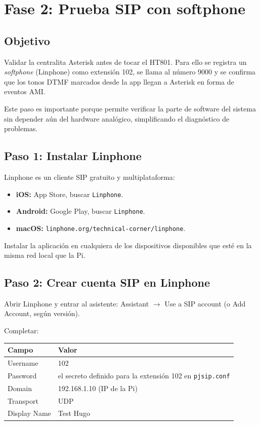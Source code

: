 \chapter{Fase 2: Prueba SIP con softphone}

\section{Objetivo}

Validar la centralita Asterisk antes de tocar el HT801. Para ello se registra un \emph{softphone} (Linphone) como extensión 102, se llama al número 9000 y se confirma que los tonos DTMF marcados desde la app llegan a Asterisk en forma de eventos AMI.

Este paso es importante porque permite verificar la parte de software del sistema sin depender aún del hardware analógico, simplificando el diagnóstico de problemas.

\section{Paso 1: Instalar Linphone}

Linphone es un cliente SIP gratuito y multiplataforma:

\begin{itemize}
  \item \textbf{iOS:} App Store, buscar \texttt{Linphone}.
  \item \textbf{Android:} Google Play, buscar \texttt{Linphone}.
  \item \textbf{macOS:} \texttt{linphone.org/technical-corner/linphone}.
\end{itemize}

Instalar la aplicación en cualquiera de los dispositivos disponibles que esté en la misma red local que la Pi.

\section{Paso 2: Crear cuenta SIP en Linphone}

Abrir Linphone y entrar al asistente: \textsf{Assistant} $\to$ \textsf{Use a SIP account} (o \textsf{Add Account}, según versión).

Completar:

\begin{table}[h]
\centering
\begin{tabular}{ll}
\toprule
\textbf{Campo} & \textbf{Valor} \\
\midrule
Username & 102 \\
Password & el secreto definido para la extensión 102 en \texttt{pjsip.conf} \\
Domain & 192.168.1.10 (IP de la Pi) \\
Transport & UDP \\
Display Name & Test Hugo \\
\bottomrule
\end{tabular}
\end{table}

